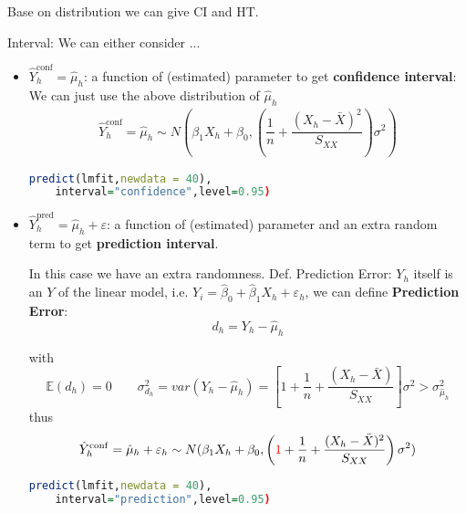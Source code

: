     Base on distribution we can give CI and HT.

\begin{point}
    Interval: We can either consider ...
\end{point}

    \begin{itemize}[topsep=2pt,itemsep=2pt]
        \item $ \hat{Y}_h^\mathrm{ conf } =\hat{\mu }_h $: a function of (estimated) parameter to get \textbf{confidence interval}: 
        We can just use the above distribution of $ \hat{\mu }_h $
        \begin{align*}
            \hat{Y}_h^\mathrm{ conf }=\hat{\mu }_h\sim   N(\beta _1X_h+\beta _0,\left( \dfrac{1}{n}+\dfrac{(X_h-\bar{X})^2}{S_{XX}} \right)\sigma^2) 
        \end{align*}
        
        

        \begin{rcode}
\begin{lstlisting}[language=R]
predict(lmfit,newdata = 40),
    interval="confidence",level=0.95)
\end{lstlisting}
        \end{rcode}
        \item $ \hat{Y}_h^\mathrm{ pred }=\hat{\mu }_h+\varepsilon   $: a function of (estimated) parameter and an extra random term to get \textbf{prediction interval}.

        In this case we have an extra randomness. Def. Prediction Error: $ Y_h $ itself is an $ Y $ of the linear model, i.e. $ Y_i=\hat{\beta}_0+\hat{\beta }_1X_h+\varepsilon _h $, we can define \textbf{Prediction Error}: 
        \begin{equation}
            d_h=Y_h-\hat{\mu}_h 
        \end{equation}
    
        with
        \begin{equation}
            \mathbb{E}(d_h)=0\qquad \sigma^2_{d_h}=var(Y_h-\hat{\mu }_h)=\left[ 1+\dfrac{1}{n}+\dfrac{(X_h-\bar{X})}{S_{XX}} \right]\sigma^2 > \sigma ^2_{\hat{\mu}_h}
        \end{equation}
        thus
        \begin{align*}
            \hat{Y}_h^\mathrm{ conf }=\hat{\mu }_h+\varepsilon _h \sim   N(\beta _1X_h+\beta _0,\left( {\color{red}1}+\dfrac{1}{n}+\dfrac{(X_h-\bar{X})^2}{S_{XX}} \right)\sigma^2) 
        \end{align*}
        

\begin{rcode}
\begin{lstlisting}[language=R]
predict(lmfit,newdata = 40),
    interval="prediction",level=0.95)
\end{lstlisting}
\end{rcode}
    
    \end{itemize}

